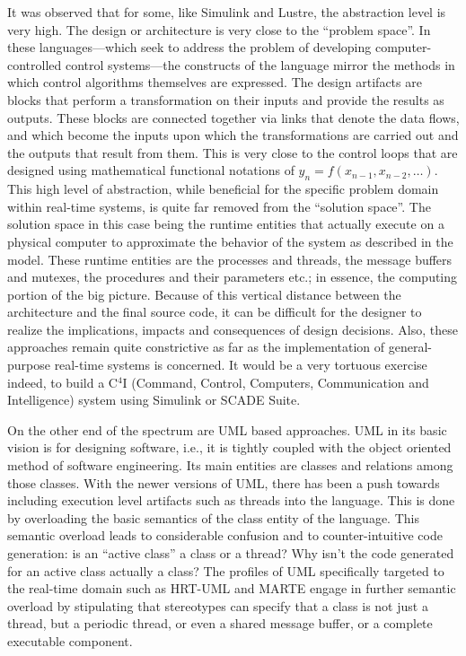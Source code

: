 It was observed that for some, like Simulink and Lustre, the
abstraction level is very high. The design or architecture is very
close to the ``problem space''. In these languages---which seek to
address the problem of developing computer-controlled control
systems---the constructs of the language mirror the methods in which
control algorithms themselves are expressed. The design artifacts are
blocks that perform a transformation on their inputs and provide the
results as outputs. These blocks are connected together via links that
denote the data flows, and which become the inputs upon which the
transformations are carried out and the outputs that result from
them. This is very close to the control loops that are designed using
mathematical functional notations of $y_n = f(x_{n-1}, x_{n-2},
\dots)$. This high level of abstraction, while beneficial for the
specific problem domain within real-time systems, is quite far removed
from the ``solution space''. The solution space in this case being the
runtime entities that actually execute on a physical computer to
approximate the behavior of the system as described in the
model. These runtime entities are the processes and threads, the
message buffers and mutexes, the procedures and their parameters etc.;
in essence, the computing portion of the big picture. Because of this
vertical distance between the architecture and the final source code,
it can be difficult for the designer to realize the implications,
impacts and consequences of design decisions. Also, these approaches
remain quite constrictive as far as the implementation of
general-purpose real-time systems is concerned. It would be a very
tortuous exercise indeed, to build a C$^4$I (Command, Control,
Computers, Communication and Intelligence) system using Simulink or
SCADE Suite.

On the other end of the spectrum are UML based approaches. UML in its
basic vision is for designing software, i.e., it is tightly coupled
with the object oriented method of software engineering. Its main
entities are classes and relations among those classes. With the newer
versions of UML, there has been a push towards including execution
level artifacts such as threads into the language. This is done by
overloading the basic semantics of the class entity of the
language. This semantic overload leads to considerable confusion and
to counter-intuitive code generation: is an ``active class'' a class
or a thread? Why isn't the code generated for an active class actually
a class? The profiles of UML specifically targeted to the real-time
domain such as HRT-UML and MARTE engage in further semantic overload
by stipulating that stereotypes can specify that a class is not just a
thread, but a periodic thread, or even a shared message buffer, or a
complete executable component.

